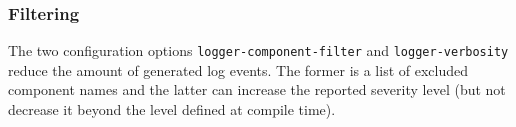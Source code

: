 \subsubsection{Filtering}
\label{log-output-filtering}

The two configuration options \lstinline^logger-component-filter^ and \lstinline^logger-verbosity^ reduce the amount of generated log events. The former is a list of excluded component names and the latter can increase the reported severity level (but not decrease it beyond the level defined at compile time).